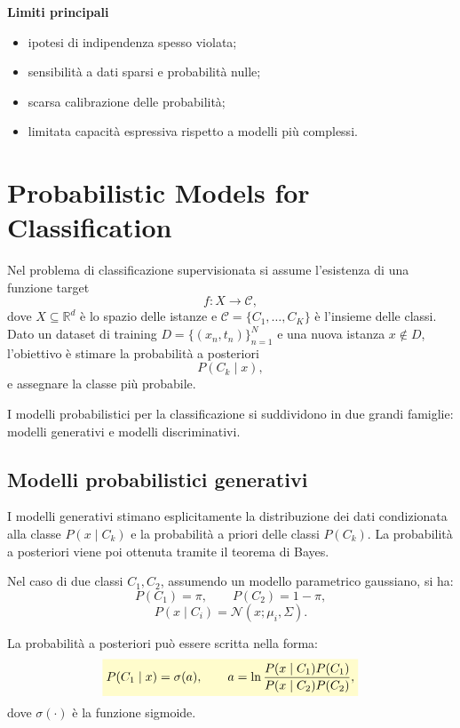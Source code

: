 \documentclass[a4paper,12pt]{report}
\newcommand{\highlight}[1]{%
\colorbox{yellow!20}{$\displaystyle #1$}%
}
\begin{document}
\begin{tcolorbox}[
    colback=green!10,
    colframe=green!50!black,
    boxrule=0.4pt,
    left=6pt,
    right=6pt,
    top=6pt,
    bottom=6pt,
    breakable
]
\medskip
\textbf{Limiti principali}  
\begin{itemize}
    \item ipotesi di indipendenza spesso violata;
    \item sensibilità a dati sparsi e probabilità nulle;
    \item scarsa calibrazione delle probabilità;
    \item limitata capacità espressiva rispetto a modelli più complessi.
\end{itemize}

\end{tcolorbox}

\chapter{Probabilistic Models for Classification}

Nel problema di classificazione supervisionata si assume l’esistenza di una funzione target
\[
f : X \rightarrow \mathcal{C},
\]
dove \( X \subseteq \mathbb{R}^d \) è lo spazio delle istanze e \( \mathcal{C} = \{C_1, \dots, C_K\} \) è l’insieme delle classi.
Dato un dataset di training \( D = \{(x_n, t_n)\}_{n=1}^N \) e una nuova istanza \( x \notin D \), l’obiettivo è stimare la probabilità a posteriori
\[
P(C_k \mid x),
\]
e assegnare la classe più probabile.

I modelli probabilistici per la classificazione si suddividono in due grandi famiglie: modelli generativi e modelli discriminativi.

\section{Modelli probabilistici generativi}

I modelli generativi stimano esplicitamente la distribuzione dei dati condizionata alla classe \( P(x \mid C_k) \) e la probabilità a priori delle classi \( P(C_k) \).
La probabilità a posteriori viene poi ottenuta tramite il teorema di Bayes.

Nel caso di due classi \( C_1, C_2 \), assumendo un modello parametrico gaussiano, si ha:
\[
P(C_1) = \pi, \qquad P(C_2) = 1 - \pi,
\]
\[
P(x \mid C_i) = \mathcal{N}(x; \mu_i, \Sigma).
\]

La probabilità a posteriori può essere scritta nella forma:
\[
\highlight{
P(C_1 \mid x) = \sigma(a),
\qquad
a = \ln \frac{P(x \mid C_1)P(C_1)}{P(x \mid C_2)P(C_2)},}
\]
dove \( \sigma(\cdot) \) è la funzione sigmoide.
\end{document}
